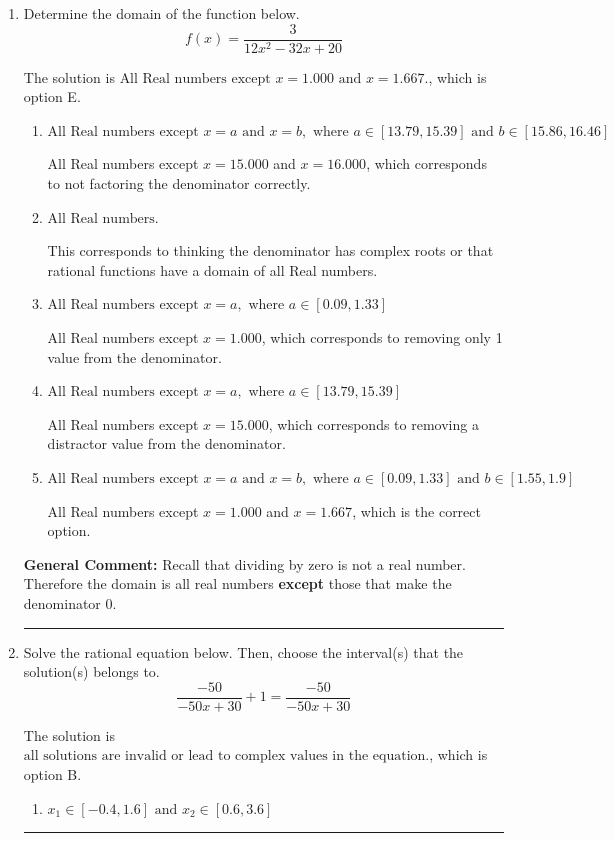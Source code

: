 \documentclass{extbook}[14pt]
\newcommand{\litem}[1]{\item #1

\rule{\textwidth}{0.4pt}}
\begin{document}
\begin{enumerate}\litem{
Determine the domain of the function below.
\[ f(x) = \frac{3}{12x^{2} -32 x + 20} \]

The solution is \( \text{All Real numbers except } x = 1.000 \text{ and } x = 1.667. \), which is option E.\begin{enumerate}[label=\Alph*.]
\item \( \text{All Real numbers except } x = a \text{ and } x = b, \text{ where } a \in [13.79, 15.39] \text{ and } b \in [15.86, 16.46] \)

All Real numbers except $x = 15.000$ and $x = 16.000$, which corresponds to not factoring the denominator correctly.
\item \( \text{All Real numbers.} \)

This corresponds to thinking the denominator has complex roots or that rational functions have a domain of all Real numbers.
\item \( \text{All Real numbers except } x = a, \text{ where } a \in [0.09, 1.33] \)

All Real numbers except $x = 1.000$, which corresponds to removing only 1 value from the denominator.
\item \( \text{All Real numbers except } x = a, \text{ where } a \in [13.79, 15.39] \)

All Real numbers except $x = 15.000$, which corresponds to removing a distractor value from the denominator.
\item \( \text{All Real numbers except } x = a \text{ and } x = b, \text{ where } a \in [0.09, 1.33] \text{ and } b \in [1.55, 1.9] \)

All Real numbers except $x = 1.000$ and $x = 1.667$, which is the correct option.
\end{enumerate}

\textbf{General Comment:} Recall that dividing by zero is not a real number. Therefore the domain is all real numbers \textbf{except} those that make the denominator 0.
}
\litem{
Solve the rational equation below. Then, choose the interval(s) that the solution(s) belongs to.
\[ \frac{-50}{-50x + 30} + 1 = \frac{-50}{-50x + 30} \]

The solution is \( \text{all solutions are invalid or lead to complex values in the equation.} \), which is option B.\begin{enumerate}[label=\Alph*.]
\item \( x_1 \in [-0.4, 1.6] \text{ and } x_2 \in [0.6,3.6] \)


\end{enumerate}}
\end{enumerate}
\end{document}
